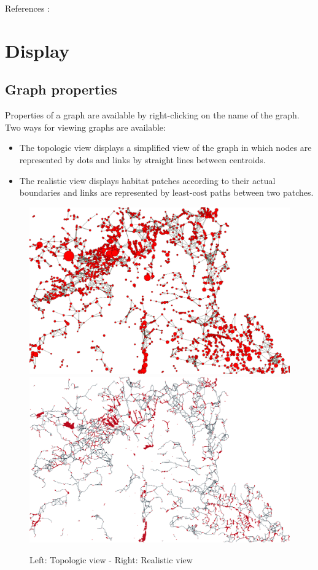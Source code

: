 \documentclass{article}
\begin{document}
\bigskip
References : \cite{2012_SDM, 2012_graphab_EMS, 2013_SDM, 2013_SDM_rainette}

\section{Display}

\subsection{Graph properties}

Properties of a graph are available by right-clicking on the name of the graph. Two ways for viewing graphs are available: 
\begin{itemize}
	\item The topologic view displays a simplified view of the graph in which nodes are represented by dots and links by straight lines between centroids.
	\item The realistic view displays habitat patches according to their actual boundaries and links are represented by least-cost paths between two patches.
\end{itemize}

\begin{figure}[H]
	\includegraphics[scale=0.1]{img/manual-en_img16.png}
	\includegraphics[scale=0.1]{img/manual-en_img17.png}
	\caption*{Left: Topologic view - Right: Realistic view}
\end{figure}
\end{document}
